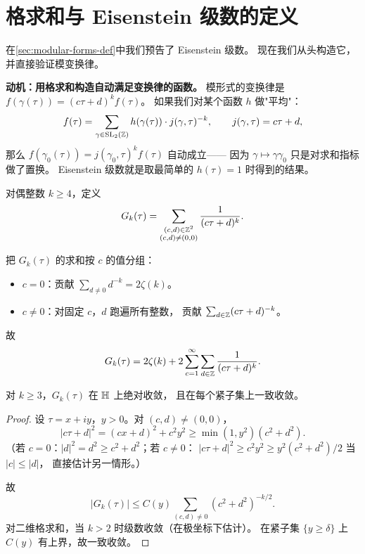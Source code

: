 \section{格求和与 Eisenstein 级数的定义}
\label{sec:lattice-sum-eisenstein}

在\cref{sec:modular-forms-def}中我们预告了 Eisenstein 级数。
现在我们从头构造它，并直接验证模变换律。

\textbf{动机：用格求和构造自动满足变换律的函数。}
模形式的变换律是 $f(\gamma(\tau)) = (c\tau + d)^k f(\tau)$。
如果我们对某个函数 $h$ 做"平均"：
\[
  f(\tau) = \sum_{\gamma \in \mathrm{SL}_2(\mathbb{Z})} h(\gamma(\tau)) \cdot j(\gamma, \tau)^{-k},
  \qquad j(\gamma, \tau) = c\tau + d,
\]
那么 $f(\gamma_0(\tau)) = j(\gamma_0, \tau)^k f(\tau)$ 自动成立——
因为 $\gamma \mapsto \gamma\gamma_0$ 只是对求和指标做了置换。
Eisenstein 级数就是取最简单的 $h(\tau) = 1$ 时得到的结果。

\begin{definition}[Eisenstein 级数 $G_k$]
\label{def:eisenstein-Gk}
对偶整数 $k \geq 4$，定义
\[
  G_k(\tau) = \sum_{\substack{(c,d) \in \mathbb{Z}^2 \\ (c,d) \neq (0,0)}}
  \frac{1}{(c\tau + d)^k}.
\]
\end{definition}

\begin{example}[前几项展开]
\label{ex:Gk-first-terms}
把 $G_k(\tau)$ 的求和按 $c$ 的值分组：
\begin{itemize}
  \item $c = 0$：贡献 $\sum_{d \neq 0} d^{-k} = 2\zeta(k)$。
  \item $c \neq 0$：对固定 $c$，$d$ 跑遍所有整数，
    贡献 $\sum_{d \in \mathbb{Z}} (c\tau + d)^{-k}$。
\end{itemize}
故
\[
  G_k(\tau) = 2\zeta(k) + 2 \sum_{c=1}^{\infty} \sum_{d \in \mathbb{Z}} \frac{1}{(c\tau + d)^k}.
\]
\end{example}

\begin{proposition}[绝对收敛性]
\label{prop:Gk-convergence}
对 $k \geq 3$，$G_k(\tau)$ 在 $\mathbb{H}$ 上绝对收敛，
且在每个紧子集上一致收敛。
\end{proposition}

\begin{proof}
设 $\tau = x + iy$，$y > 0$。对 $(c, d) \neq (0, 0)$，
\[
  |c\tau + d|^2 = (cx + d)^2 + c^2 y^2 \geq \min(1, y^2)(c^2 + d^2).
\]
（若 $c = 0$：$|d|^2 = d^2 \geq c^2+d^2$；若 $c \neq 0$：
$|c\tau+d|^2 \geq c^2y^2 \geq y^2(c^2+d^2)/2$ 当 $|c| \leq |d|$，
直接估计另一情形。）

故
\[
  |G_k(\tau)| \leq C(y) \sum_{(c,d) \neq 0} (c^2 + d^2)^{-k/2}.
\]
对二维格求和，当 $k > 2$ 时级数收敛（在极坐标下估计）。
在紧子集 $\{y \geq \delta\}$ 上 $C(y)$ 有上界，故一致收敛。
\end{proof}

